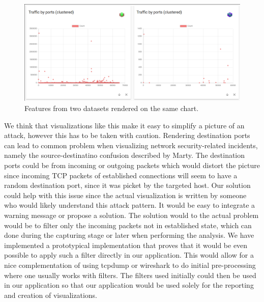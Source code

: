 \begin{figure}[datasettiles]
    \centering
    \includegraphics[width=15cm]{images/evaluation_different_datasets_same_visualization.png}
    \caption{Features from two datasets rendered on the same chart.}
    \label{fig:datasettilesop}
\end{figure}

We think that visualizations like this make it easy to simplify a picture of an attack, however this has to be taken with caution. Rendering destination ports can lead to common problem when visualizing network security-related incidents, namely the source-destinatino confusion described by Marty\cite{appliedsecurityvisualization}. The destination ports could be from incoming or outgoing packets which would distort the picture since incoming TCP packets of established connections will seem to have a random destination port, since it was picket by the targeted host. Our solution could help with this issue since the actual visualization is written by someone who would likely understand this attack pattern. It would be easy to integrate a warning message or propose a solution. The solution would to the actual problem would be to filter only the incoming packets not in established state, which can done during the capturing stage or later when performing the analysis. We have implemented a prototypical implementation that proves that it would be even possible to apply such a filter directly in our application. This would allow for a nice complementation of using tcpdump or wireshark to do initial pre-processing where one usually works with filters. The filters used initially could then be used in our application so that our application would be used solely for the reporting and creation of visualizations.


